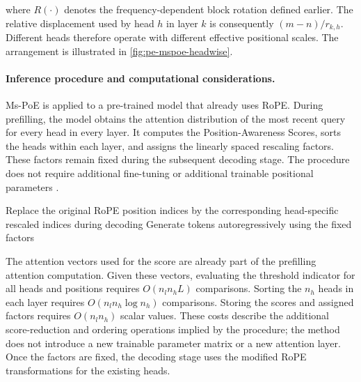 where \(R(\cdot)\) denotes the frequency-dependent block rotation
defined earlier. The relative displacement used by head \(h\) in layer
\(k\) is consequently \((m-n)/r_{k,h}\). Different heads therefore
operate with different effective positional scales. The arrangement is
illustrated in \cref{fig:pe-mspoe-headwise}.

\paragraph{Inference procedure and computational considerations.}
Ms-PoE is applied to a pre-trained model that already uses RoPE. During
prefilling, the model obtains the attention distribution of the most
recent query for every head in every layer. It computes the
Position-Awareness Scores, sorts the heads within each layer, and assigns
the linearly spaced rescaling factors. These factors remain fixed during
the subsequent decoding stage. The procedure does not require additional
fine-tuning or additional trainable positional parameters
\parencite{zhang2024foundmiddle}.

\begin{algorithm}[H]
    \caption{Head-wise positional rescaling in Ms-PoE}
    \label{alg:pe-mspoe}
    Replace the original RoPE position indices by the corresponding
    head-specific rescaled indices during decoding\;
    Generate tokens autoregressively using the fixed factors\;
\end{algorithm}

The attention vectors used for the score are already part of the
prefilling attention computation. Given these vectors, evaluating the
threshold indicator for all heads and positions requires
\(O(n_l n_h L)\) comparisons. Sorting the \(n_h\) heads in each layer
requires \(O(n_l n_h\log n_h)\) comparisons. Storing the scores and
assigned factors requires \(O(n_l n_h)\) scalar values. These costs
describe the additional score-reduction and ordering operations implied
by the procedure; the method does not introduce a new trainable
parameter matrix or a new attention layer. Once the factors are fixed,
the decoding stage uses the modified RoPE transformations for the
existing heads.

